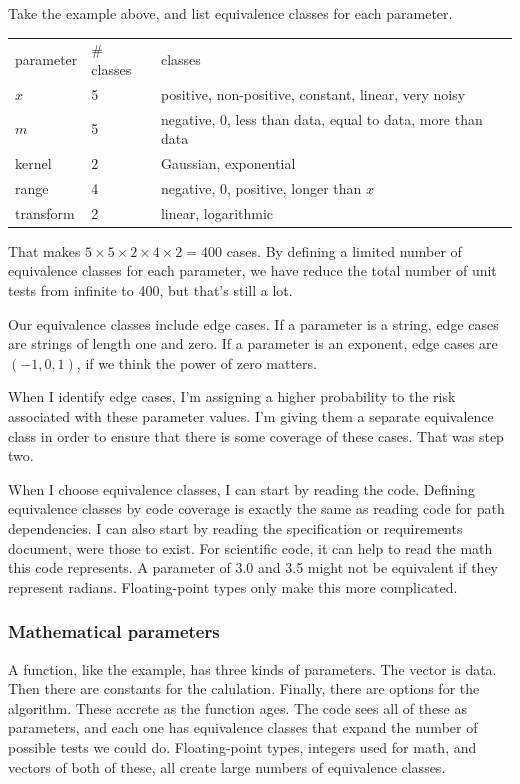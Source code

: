 \documentclass[fleqn,10pt]{olplainarticle}
\begin{document}
Take the example above, and list equivalence classes for each parameter.
\begin{center}
\begin{tabular}{|l|l|l|}\hline
parameter & \# classes & classes \\
$x$ & 5 & positive, non-positive, constant, linear, very noisy \\
$m$ & 5 & negative, 0, less than data, equal to data, more than data \\
kernel & 2 & Gaussian, exponential \\
range & 4 & negative, 0, positive, longer than $x$ \\
transform & 2 & linear, logarithmic \\ \hline
\end{tabular}
\end{center}
That makes $5\times 5 \times 2 \times 4\times 2 = 400$ cases.
By defining a limited number of equivalence classes for
each parameter, we have reduce the total number of unit tests
from infinite to 400, but that's still a lot.

Our equivalence classes include edge cases. If a parameter
is a string, edge cases are strings of length one and zero.
If a parameter is an exponent, edge cases are $(-1, 0, 1)$,
if we think the power of zero matters.

When I identify edge cases, I'm assigning a higher probability
to the risk associated with these parameter values. I'm
giving them a separate equivalence class in order to ensure
that there is some coverage of these cases. That was
step two.

When I choose equivalence classes, I can start by reading
the code. Defining equivalence classes by code coverage is
exactly the same as reading code for path dependencies.
I can also start by reading the specification or requirements
document, were those to exist. For scientific code,
it can help to read the math this code represents.
A parameter of 3.0 and 3.5 might not be equivalent if they
represent radians. Floating-point types only make this
more complicated.

\subsubsection{Mathematical parameters}

A function, like the example, has three kinds of parameters.
The vector is data. Then there are constants for the calulation.
Finally, there are options for the algorithm. These accrete
as the function ages. The code sees all of these as parameters,
and each one has equivalence classes that expand the
number of possible tests we could do.
Floating-point types, integers used for math, and vectors
of both of these, all create large numbers of equivalence classes.
\end{document}
